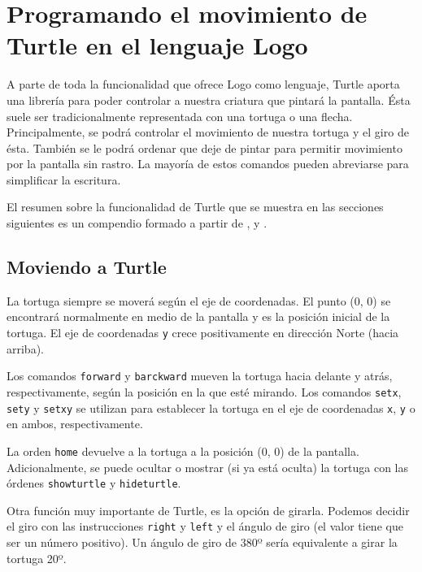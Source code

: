 

\chapter{Programando el movimiento de Turtle en el lenguaje Logo}
\label{anexo:logo-turtle-lenguaje}

A parte de toda la funcionalidad que ofrece Logo como lenguaje, Turtle aporta una librería para poder controlar a nuestra criatura que pintará la pantalla. Ésta suele ser tradicionalmente representada con una tortuga o una flecha. Principalmente, se podrá controlar el movimiento de nuestra tortuga y el giro de ésta. También se le podrá ordenar que deje de pintar para permitir movimiento por la pantalla sin rastro. La mayoría de estos comandos pueden abreviarse para simplificar la escritura.

El resumen sobre la funcionalidad de Turtle que se muestra en las secciones siguientes es un compendio formado a partir de \cite{logo-turtle-lenguaje}, \cite{turtle-academy} y \cite{abelson1980disessa}.


\section*{Moviendo a Turtle}

La tortuga siempre se moverá según el eje de coordenadas. El punto (0, 0) se encontrará normalmente en medio de la pantalla y es la posición inicial de la tortuga. El eje de coordenadas \texttt{y} crece positivamente en dirección Norte (hacia arriba).

Los comandos \texttt{forward} y \texttt{barckward} mueven la tortuga hacia delante y atrás, respectivamente, según la posición en la que esté mirando. Los comandos \texttt{setx}, \texttt{sety} y \texttt{setxy} se utilizan para establecer la tortuga en el eje de coordenadas \texttt{x}, \texttt{y} o en ambos, respectivamente.

La orden \texttt{home} devuelve a la tortuga a la posición (0, 0) de la pantalla. Adicionalmente, se puede ocultar o mostrar (si ya está oculta) la tortuga con las órdenes \texttt{showturtle} y \texttt{hideturtle}.

Otra función muy importante de Turtle, es la opción de girarla. Podemos decidir el giro con las instrucciones \texttt{right} y \texttt{left} y el ángulo de giro (el valor tiene que ser un número positivo). Un ángulo de giro de 380º sería equivalente a girar la tortuga 20º.


